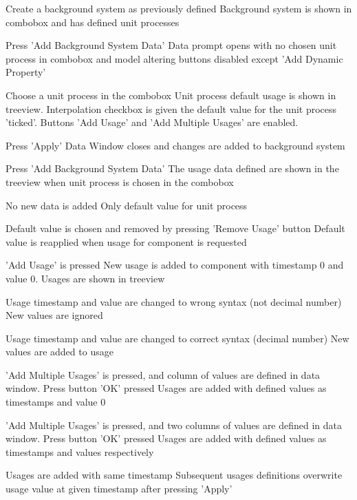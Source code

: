 

{
\step
{Create a background system as previously defined}
{Background system is shown in combobox and has defined unit processes}

\step
{Press 'Add Background System Data'}
{Data prompt opens with no chosen unit process in combobox and model altering buttons disabled except 'Add Dynamic Property'}

\step
{Choose a unit process in the combobox}
{Unit process default usage is shown in treeview. Interpolation checkbox is given the default value for the unit process 'ticked'. Buttons 'Add Usage' and 'Add Multiple Usages' are enabled.}

\placeholder

\step
{Press 'Apply'}
{Data Window closes and changes are added to background system}

\step
{Press 'Add Background System Data'}
{The usage data defined are shown in the treeview when unit process is chosen in the combobox}
}

\placeholders
{
\step
{No new data is added}
{Only default value for unit process}

\step
{Default value is chosen and removed by pressing 'Remove Usage' button}
{Default value is reapplied when usage for component is requested}

\step
{'Add Usage' is pressed}
{New usage is added to component with timestamp 0 and value 0. Usages are shown in treeview}

\step
{Usage timestamp and value are changed to wrong syntax (not decimal number)}
{New values are ignored}

\step
{Usage timestamp and value are changed to correct syntax (decimal number)}
{New values are added to usage}

\step
{'Add Multiple Usages' is pressed, and column of values are defined in data window. Press button 'OK' pressed}
{Usages are added with defined values as timestamps and value 0}

\step
{'Add Multiple Usages' is pressed, and two columns of values are defined in data window. Press button 'OK' pressed}
{Usages are added with defined values as timestamps and values respectively}

\step
{Usages are added with same timestamp}
{Subsequent usages definitions overwrite usage value at given timestamp after pressing 'Apply'}
}




